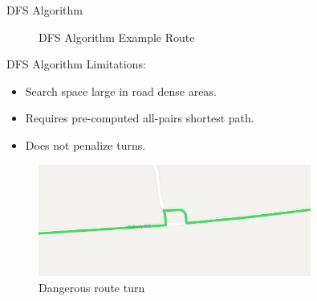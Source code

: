 \documentclass{beamer}
\begin{document}
\begin{frame}{DFS Algorithm \cite{verbeeck2014extension}}
\begin{figure}
\caption{DFS Algorithm Example Route}
\end{figure}
\end{frame}

\begin{frame}{DFS Algorithm \cite{verbeeck2014extension}}
Limitations:
\begin{itemize}
    \item Search space large in road dense areas.
    \item Requires pre-computed all-pairs shortest path.
    \item Does not penalize turns.
\end{itemize}
\begin{figure}
\begin{center}
\includegraphics[width=0.8\textwidth]{figs/vva_route_turn}
\end{center}
\caption{Dangerous route turn}
\end{figure}
\end{frame}
\end{document}
